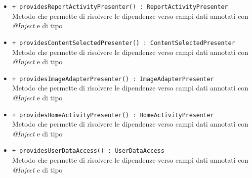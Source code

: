 \documentclass[../Tesi.tex]{subfiles}
\begin{document}
\begin{description}
\begin{itemize}
				\item \texttt{+ providesReportActivityPresenter() : ReportActivityPresenter}\\
				Metodo che permette di risolvere le dipendenze verso campi dati annotati con \textit{@Inject} e di tipo 

				\item \texttt{+ providesContentSelectedPresenter() : ContentSelectedPresenter}\\
				Metodo che permette di risolvere le dipendenze verso campi dati annotati con \textit{@Inject} e di tipo 

				\item \texttt{+ providesImageAdapterPresenter() : ImageAdapterPresenter}\\
				Metodo che permette di risolvere le dipendenze verso campi dati annotati con \textit{@Inject} e di tipo 

				\item \texttt{+ providesHomeActivityPresenter() : HomeActivityPresenter}\\
				Metodo che permette di risolvere le dipendenze verso campi dati annotati con \textit{@Inject} e di tipo 

				\item \texttt{+ providesUserDataAccess() : UserDataAccess}\\
				Metodo che permette di risolvere le dipendenze verso campi dati annotati con \textit{@Inject} e di tipo 
			\end{itemize}
		\end{description}
\end{document}
